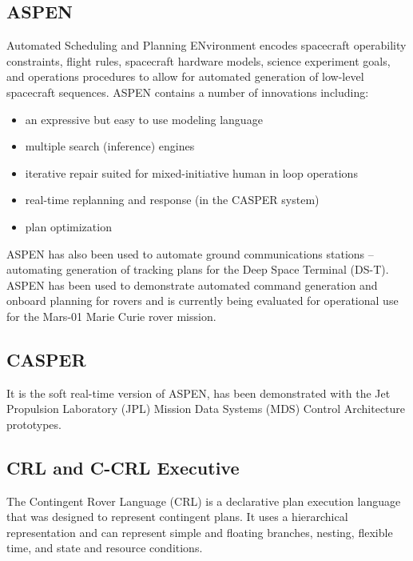 \documentclass[conference]{IEEEtran}
\begin{document}
\subsection{\textbf{ASPEN}}\label{sec:aspen}
Automated Scheduling and Planning ENvironment encodes spacecraft operability constraints, flight rules, spacecraft hardware models, science experiment goals, and operations procedures to allow for automated generation of low-level spacecraft sequences. ASPEN contains a number of innovations including: 

\begin{itemize}
  \item an expressive but easy to use modeling language
  \item multiple search (inference) engines
  \item iterative repair suited for mixed-initiative human in loop operations
  \item real-time replanning and response (in the CASPER system)
  \item plan optimization
\end{itemize}
 
ASPEN has also been used to automate ground communications stations – automating generation of tracking plans for the Deep Space Terminal (DS-T). ASPEN has been used to demonstrate automated command generation and onboard planning for rovers and is currently being evaluated for operational use for the Mars-01 Marie Curie rover mission. 


\subsection{\textbf{CASPER}}\label{sec:casper}
It is the soft real-time version of ASPEN, has been demonstrated with the Jet Propulsion Laboratory (JPL) Mission Data Systems (MDS) Control Architecture prototypes.

\subsection{\textbf{CRL and C-CRL Executive}}\label{sec:crl}
The Contingent Rover Language (CRL) is a declarative plan execution language that was designed to represent contingent plans. It uses a hierarchical representation and can represent simple and floating branches, nesting, flexible time, and state and resource conditions. 
\end{document}
